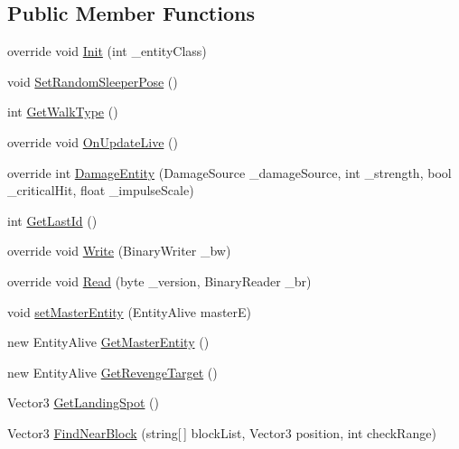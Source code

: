 \subsection*{Public Member Functions}
\begin{DoxyCompactItemize}
\item 
override void \mbox{\hyperlink{class_entity_zombie_flock_s_d_x_ab2c8f83118451e6c8d6b7b5d06f72a41}{Init}} (int \+\_\+entity\+Class)
\item 
void \mbox{\hyperlink{class_entity_zombie_flock_s_d_x_ab32af08d3a224ee4f651b19c97b612cc}{Set\+Random\+Sleeper\+Pose}} ()
\item 
int \mbox{\hyperlink{class_entity_zombie_flock_s_d_x_a44fdfec0a852e053f1b21d06e36a013d}{Get\+Walk\+Type}} ()
\item 
override void \mbox{\hyperlink{class_entity_zombie_flock_s_d_x_a30325689af703b6ae155a9973834ebfb}{On\+Update\+Live}} ()
\item 
override int \mbox{\hyperlink{class_entity_zombie_flock_s_d_x_ab53b54babb3ad00b48f251ed424ea8e9}{Damage\+Entity}} (Damage\+Source \+\_\+damage\+Source, int \+\_\+strength, bool \+\_\+critical\+Hit, float \+\_\+impulse\+Scale)
\item 
int \mbox{\hyperlink{class_entity_zombie_flock_s_d_x_a2a69b88e7da168d3179a04f2a896ecb6}{Get\+Last\+Id}} ()
\item 
override void \mbox{\hyperlink{class_entity_zombie_flock_s_d_x_aa40097723a711d8d61176d329fd59358}{Write}} (Binary\+Writer \+\_\+bw)
\item 
override void \mbox{\hyperlink{class_entity_zombie_flock_s_d_x_acc714fdc92fd4f9d5d72d91547657e13}{Read}} (byte \+\_\+version, Binary\+Reader \+\_\+br)
\item 
void \mbox{\hyperlink{class_entity_zombie_flock_s_d_x_a8ea9d4853508a5d7d547e1e8b27c1b66}{set\+Master\+Entity}} (Entity\+Alive masterE)
\item 
new Entity\+Alive \mbox{\hyperlink{class_entity_zombie_flock_s_d_x_a036371f56bc32a1588d860af64372ced}{Get\+Master\+Entity}} ()
\item 
new Entity\+Alive \mbox{\hyperlink{class_entity_zombie_flock_s_d_x_aec7a0267dc85291cd1ccf4827fce82b3}{Get\+Revenge\+Target}} ()
\item 
Vector3 \mbox{\hyperlink{class_entity_zombie_flock_s_d_x_a71d431779b9e6541ff31f6bc8d3d5009}{Get\+Landing\+Spot}} ()
\item 
Vector3 \mbox{\hyperlink{class_entity_zombie_flock_s_d_x_a70cabbcd217d21a24716c745866666f4}{Find\+Near\+Block}} (string\mbox{[}$\,$\mbox{]} block\+List, Vector3 position, int check\+Range)
\end{DoxyCompactItemize}
